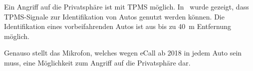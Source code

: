 Ein Angriff auf die Privatsphäre ist mit TPMS möglich. In~\cite{Rouf2010} wurde
gezeigt, dass TPMS-Signale zur Identifikation von Autos genutzt werden können.
Die Identifikation eines vorbeifahrenden Autos ist aus bis zu \SI{40}{\meter}
Entfernung möglich.

Genauso stellt das Mikrofon, welches wegen eCall ab 2018 in jedem Auto sein
muss, eine Möglichkeit zum Angriff auf die Privatsphäre dar.




